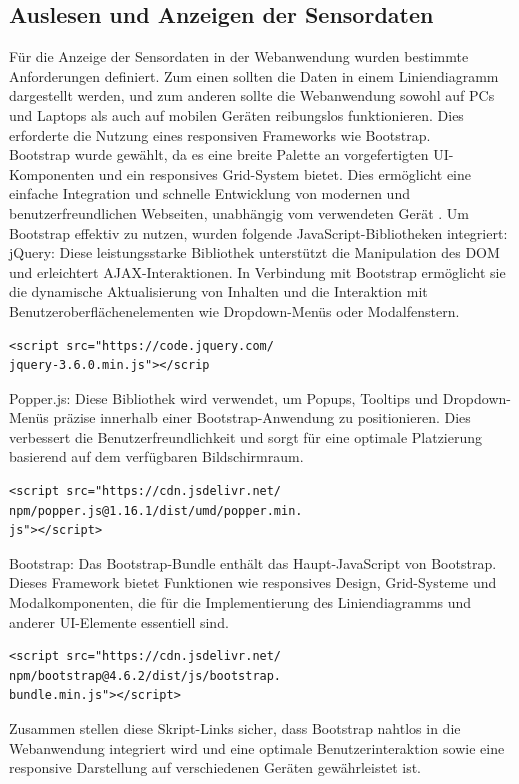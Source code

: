 \documentclass[conference]{IEEEtran}
\begin{document}
\subsection{Auslesen und Anzeigen der Sensordaten}
Für die Anzeige der Sensordaten in der Webanwendung wurden bestimmte Anforderungen definiert. Zum einen sollten die Daten in einem Liniendiagramm dargestellt werden, und zum anderen sollte die Webanwendung sowohl auf PCs und Laptops als auch auf mobilen Geräten reibungslos funktionieren. Dies erforderte die Nutzung eines responsiven Frameworks wie Bootstrap. \\
Bootstrap wurde gewählt, da es eine breite Palette an vorgefertigten UI-Komponenten und ein responsives Grid-System bietet. Dies ermöglicht eine einfache Integration und schnelle Entwicklung von modernen und benutzerfreundlichen Webseiten, unabhängig vom verwendeten Gerät \cite{bootstrap}.
Um Bootstrap effektiv zu nutzen, wurden folgende JavaScript-Bibliotheken integriert: \\
jQuery: Diese leistungsstarke Bibliothek unterstützt die Manipulation des DOM und erleichtert AJAX-Interaktionen. In Verbindung mit Bootstrap ermöglicht sie die dynamische Aktualisierung von Inhalten und die Interaktion mit Benutzeroberflächenelementen wie Dropdown-Menüs oder Modalfenstern.
\begin{verbatim}
<script src="https://code.jquery.com/
jquery-3.6.0.min.js"></scrip
\end{verbatim}
Popper.js: Diese Bibliothek wird verwendet, um Popups, Tooltips und Dropdown-Menüs präzise innerhalb einer Bootstrap-Anwendung zu positionieren. Dies verbessert die Benutzerfreundlichkeit und sorgt für eine optimale Platzierung basierend auf dem verfügbaren Bildschirmraum.
\begin{verbatim}
<script src="https://cdn.jsdelivr.net/
npm/popper.js@1.16.1/dist/umd/popper.min.
js"></script>
\end{verbatim}
Bootstrap: Das Bootstrap-Bundle enthält das Haupt-JavaScript von Bootstrap. Dieses Framework bietet Funktionen wie responsives Design, Grid-Systeme und Modalkomponenten, die für die Implementierung des Liniendiagramms und anderer UI-Elemente essentiell sind.
\begin{verbatim}
<script src="https://cdn.jsdelivr.net/
npm/bootstrap@4.6.2/dist/js/bootstrap.
bundle.min.js"></script>
\end{verbatim}
Zusammen stellen diese Skript-Links sicher, dass Bootstrap nahtlos in die Webanwendung integriert wird und eine optimale Benutzerinteraktion sowie eine responsive Darstellung auf verschiedenen Geräten gewährleistet ist. \\
\end{document}
